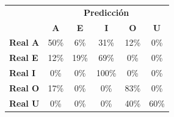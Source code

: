 \begin{tabular}{lccccc}
\toprule
 & \multicolumn{5}{c}{\textbf{Predicción}} \\
 & \textbf{A} & \textbf{E} & \textbf{I} & \textbf{O} & \textbf{U} \\
\midrule
\textbf{Real A} & \cellcolor[rgb]{0.65,0.65,1.00} \color{white} 50\% & \cellcolor[rgb]{0.96,0.96,1.00}  6\% & \cellcolor[rgb]{0.78,0.78,1.00}  31\% & \cellcolor[rgb]{0.91,0.91,1.00}  12\% & \cellcolor[rgb]{1.00,1.00,1.00}  0\% \\
\textbf{Real E} & \cellcolor[rgb]{0.92,0.92,1.00}  12\% & \cellcolor[rgb]{0.87,0.87,1.00}  19\% & \cellcolor[rgb]{0.52,0.52,1.00} \color{white} 69\% & \cellcolor[rgb]{1.00,1.00,1.00}  0\% & \cellcolor[rgb]{1.00,1.00,1.00}  0\% \\
\textbf{Real I} & \cellcolor[rgb]{1.00,1.00,1.00}  0\% & \cellcolor[rgb]{1.00,1.00,1.00}  0\% & \cellcolor[rgb]{0.30,0.30,1.00} \color{white} 100\% & \cellcolor[rgb]{1.00,1.00,1.00}  0\% & \cellcolor[rgb]{1.00,1.00,1.00}  0\% \\
\textbf{Real O} & \cellcolor[rgb]{0.88,0.88,1.00}  17\% & \cellcolor[rgb]{1.00,1.00,1.00}  0\% & \cellcolor[rgb]{1.00,1.00,1.00}  0\% & \cellcolor[rgb]{0.42,0.42,1.00} \color{white} 83\% & \cellcolor[rgb]{1.00,1.00,1.00}  0\% \\
\textbf{Real U} & \cellcolor[rgb]{1.00,1.00,1.00}  0\% & \cellcolor[rgb]{1.00,1.00,1.00}  0\% & \cellcolor[rgb]{1.00,1.00,1.00}  0\% & \cellcolor[rgb]{0.72,0.72,1.00}  40\% & \cellcolor[rgb]{0.58,0.58,1.00} \color{white} 60\% \\
\bottomrule
\end{tabular}